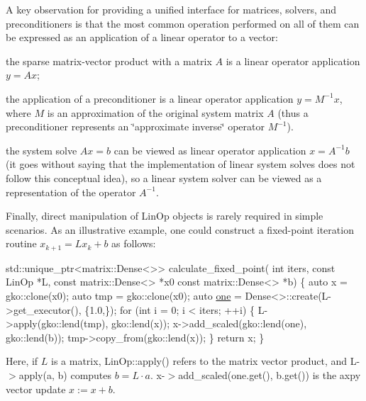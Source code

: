 A key observation for providing a unified interface for matrices, solvers, and preconditioners is that the most common operation performed on all of them can be expressed as an application of a linear operator to a vector\+:


\begin{DoxyItemize}
\item the sparse matrix-\/vector product with a matrix $A$ is a linear operator application $y = Ax$;
\item the application of a preconditioner is a linear operator application $y = M^{-1}x$, where $M$ is an approximation of the original system matrix $A$ (thus a preconditioner represents an \char`\"{}approximate
    inverse\char`\"{} operator $M^{-1}$).
\item the system solve $Ax = b$ can be viewed as linear operator application $x = A^{-1}b$ (it goes without saying that the implementation of linear system solves does not follow this conceptual idea), so a linear system solver can be viewed as a representation of the operator $A^{-1}$.
\end{DoxyItemize}

Finally, direct manipulation of Lin\+Op objects is rarely required in simple scenarios. As an illustrative example, one could construct a fixed-\/point iteration routine $x_{k+1} = Lx_k + b$ as follows\+:


\begin{DoxyCode}
std::unique\_ptr<matrix::Dense<>> calculate\_fixed\_point(
        \textcolor{keywordtype}{int} iters, \textcolor{keyword}{const} LinOp *L, \textcolor{keyword}{const} matrix::Dense<> *x0
        \textcolor{keyword}{const} matrix::Dense<> *b)
\{
    \textcolor{keyword}{auto} x = gko::clone(x0);
    \textcolor{keyword}{auto} tmp = gko::clone(x0);
    \textcolor{keyword}{auto} \hyperlink{namespacegko_a0059e27f8f4bc348ff65c1e60caf47c8}{one} = Dense<>::create(L->get\_executor(), \{1.0,\});
    \textcolor{keywordflow}{for} (\textcolor{keywordtype}{int} i = 0; i < iters; ++i) \{
        L->apply(gko::lend(tmp), gko::lend(x));
        x->add\_scaled(gko::lend(one), gko::lend(b));
        tmp->copy\_from(gko::lend(x));
    \}
    \textcolor{keywordflow}{return} x;
\}
\end{DoxyCode}


Here, if $L$ is a matrix, Lin\+Op\+::apply() refers to the matrix vector product, and {\ttfamily L-\/$>$apply(a, b)} computes $b = L \cdot a$. {\ttfamily x-\/$>$add\+\_\+scaled(one.\+get(), b.\+get())} is the {\ttfamily axpy} vector update $x:=x+b$.

